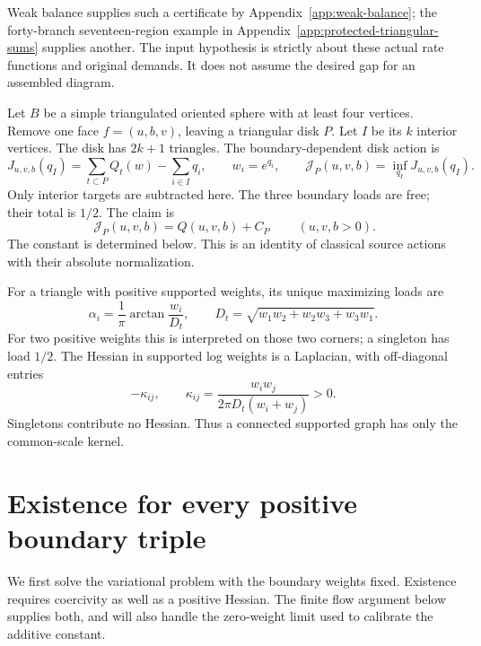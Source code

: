 Weak balance supplies such a certificate by Appendix~\ref{app:weak-balance}; the forty-branch seventeen-region example in Appendix~\ref{app:protected-triangular-sums} supplies another. The input hypothesis is strictly about these actual rate functions and original demands. It does not assume the desired gap for an assembled diagram.

Let \(B\) be a simple triangulated oriented sphere with at least four vertices. Remove one face \(f=(u,b,v)\), leaving a triangular disk \(P\). Let \(I\) be its \(k\) interior vertices. The disk has \(2k+1\) triangles. The boundary-dependent disk action is
\begin{equation}\label{tbi:eq-2}
J_{u,v,b}(q_I)=\sum_{t\subset P}Q_t(w)-\sum_{i\in I}q_i,
\qquad w_i=e^{q_i},\qquad
\mathcal J_P(u,v,b)=\inf_{q_I}J_{u,v,b}(q_I).
\end{equation}
Only interior targets are subtracted here. The three boundary loads are free; their total is \(1/2\). The claim is
\begin{equation}\label{tbi:eq-3}
\boxed{\ \mathcal J_P(u,v,b)=Q(u,v,b)+C_P\ }\qquad(u,v,b>0).
\end{equation}
The constant is determined below. This is an identity of classical source actions with their absolute normalization.

For a triangle with positive supported weights, its unique maximizing loads are
\begin{equation}\label{tbi:eq-4}
\alpha_i=\frac1\pi\arctan\frac{w_i}{D_t},
\qquad D_t=\sqrt{w_1w_2+w_2w_3+w_3w_1}.
\end{equation}
For two positive weights this is interpreted on those two corners; a singleton has load \(1/2\). The Hessian in supported log weights is a Laplacian, with off-diagonal entries
\begin{equation}\label{tbi:eq-5}
-\kappa_{ij},\qquad
\kappa_{ij}=\frac{w_iw_j}{2\pi D_t(w_i+w_j)}>0.
\end{equation}
Singletons contribute no Hessian. Thus a connected supported graph has only the common-scale kernel.

\section{Existence for every positive boundary triple}\label{tbi:sec-2}

We first solve the variational problem with the boundary weights fixed.
Existence requires coercivity as well as a positive Hessian. The finite
flow argument below supplies both, and will also handle the zero-weight
limit used to calibrate the additive constant.

